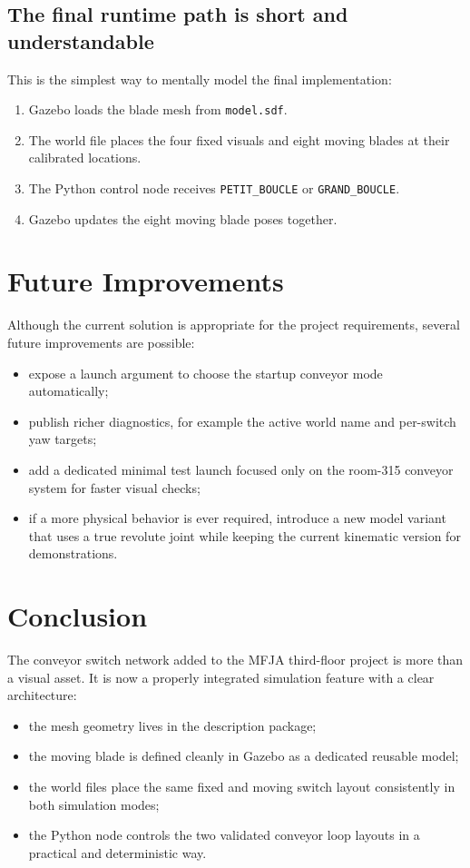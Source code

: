 \documentclass[11pt,a4paper]{article}
\begin{document}
\subsection{The final runtime path is short and understandable}
This is the simplest way to mentally model the final implementation:
\begin{enumerate}
\item Gazebo loads the blade mesh from \texttt{model.sdf}.
\item The world file places the four fixed visuals and eight moving blades at their calibrated locations.
\item The Python control node receives \texttt{PETIT\_BOUCLE} or \texttt{GRAND\_BOUCLE}.
\item Gazebo updates the eight moving blade poses together.
\end{enumerate}

\section{Future Improvements}
Although the current solution is appropriate for the project requirements, several future improvements are possible:
\begin{itemize}
\item expose a launch argument to choose the startup conveyor mode automatically;
\item publish richer diagnostics, for example the active world name and per-switch yaw targets;
\item add a dedicated minimal test launch focused only on the room-315 conveyor system for faster visual checks;
\item if a more physical behavior is ever required, introduce a new model variant that uses a true revolute joint while keeping the current kinematic version for demonstrations.
\end{itemize}

\section{Conclusion}
The conveyor switch network added to the MFJA third-floor project is more than a visual asset. It is now a properly integrated simulation feature with a clear architecture:
\begin{itemize}
\item the mesh geometry lives in the description package;
\item the moving blade is defined cleanly in Gazebo as a dedicated reusable model;
\item the world files place the same fixed and moving switch layout consistently in both simulation modes;
\item the Python node controls the two validated conveyor loop layouts in a practical and deterministic way.
\end{itemize}
\end{document}
